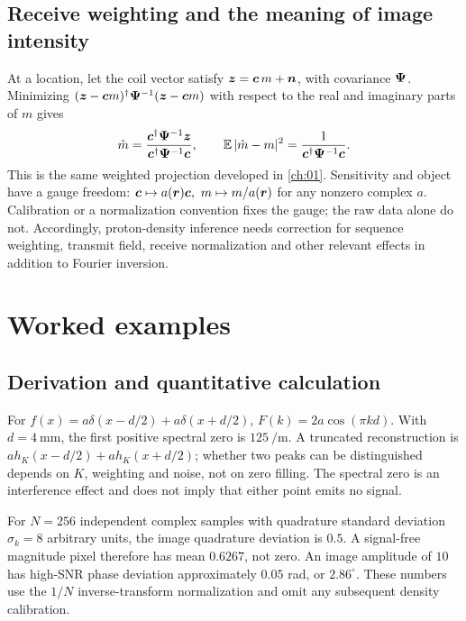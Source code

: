 \subsection{Receive weighting and the meaning of image intensity}
At a location, let the coil vector satisfy \(\bm{z}=\bm{c}\,m+\bm{n}\), with covariance \(\mathbf{\Psi}\). Minimizing
\((\bm{z}-\bm{c} m)^\dagger\mathbf{\Psi}^{-1}(\bm{z}-\bm{c} m)\) with respect to the real and imaginary parts of \(m\) gives
\begin{equation}
 \hat m=\frac{\bm{c}^\dagger\mathbf{\Psi}^{-1}\bm{z}}
              {\bm{c}^\dagger\mathbf{\Psi}^{-1}\bm{c}},
 \qquad
 \operatorname{\mathbb{E}}|\hat m-m|^2=\frac{1}{\bm{c}^\dagger\mathbf{\Psi}^{-1}\bm{c}}.
 \label{eq:06:combine}
\end{equation}
This is the same weighted projection developed in \cref{ch:01}.
Sensitivity and object have a gauge freedom:
\(\vect c\mapsto a(\vect r)\vect c,\ m\mapsto m/a(\vect r)\)
for any nonzero complex \(a\). Calibration or a normalization convention fixes the gauge; the raw data alone do not. Accordingly, proton-density inference needs correction for sequence weighting, transmit field, receive normalization and other relevant effects in addition to Fourier inversion.

\section{Worked examples}
\label{sec:06:worked-examples}
\subsection{Derivation and quantitative calculation}
\begin{workedexample}
For \(f(x)=a\delta(x-d/2)+a\delta(x+d/2)\),
\(F(k)=2a\cos(\pi kd)\). With \(d=\SI{4}{\milli\metre}\), the first positive spectral zero is \(\SI{125}{\per\metre}\).
A truncated reconstruction is
\(a h_K(x-d/2)+a h_K(x+d/2)\); whether two peaks can be distinguished depends on \(K\), weighting and noise, not on zero filling. The spectral zero is an interference effect and does not imply that either point emits no signal.
\end{workedexample}
\begin{workedexample}
For \(N=256\) independent complex samples with quadrature standard deviation \(\sigma_k=8\) arbitrary units, the image quadrature deviation is \(0.5\).
A signal-free magnitude pixel therefore has mean \(0.6267\), not zero.
An image amplitude of \(10\) has high-SNR phase deviation approximately \(0.05\) rad, or \(2.86^\circ\).
These numbers use the \(1/N\) inverse-transform normalization and omit any subsequent density calibration.
\end{workedexample}


